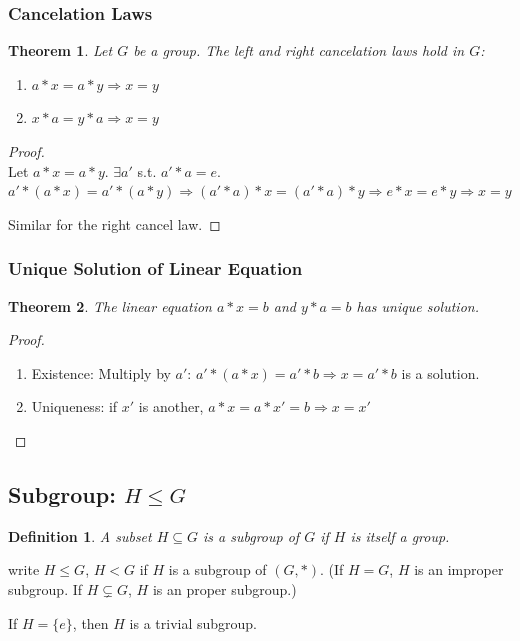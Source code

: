 \documentclass[11pt,a4paper]{article}
\newtheorem{theorem}{Theorem}
\newtheorem{definition}{Definition}
\begin{document}
\subsubsection{Cancelation Laws}
\begin{theorem}
Let $G$ be a group. The left and right cancelation laws hold in $G$:
\begin{enumerate}
    \item $a*x=a*y \Rightarrow x=y$
    \item $x*a=y*a \Rightarrow x=y$
\end{enumerate}
\end{theorem}
\begin{proof}
\quad\\
Let $a*x=a*y$. $\exists a'$ s.t. $a'*a=e$. $a'*(a*x)=a'*(a*y) \Rightarrow (a'*a)*x=(a'*a)*y \Rightarrow	e*x=e*y \Rightarrow	x=y$

Similar for the right cancel law.
\end{proof}

\subsubsection{Unique Solution of Linear Equation}
\begin{theorem}
The linear equation $a*x=b$ and $y*a=b$ has unique solution.
\end{theorem}
\begin{proof}
\quad\\
\begin{enumerate}
    \item Existence: Multiply by $a'$: $a'*(a*x)=a'*b \Rightarrow x=a'*b$ is a solution.
    \item Uniqueness: if $x'$ is another, $a*x=a*x'=b \Rightarrow x=x'$
\end{enumerate}
\end{proof}



\subsection{Subgroup: $H\leq G$}
\begin{definition}
A subset $H\subseteq G$ is a subgroup of $G$ if $H$ is itself a group.
\end{definition}
write $H\leq G$, $H<G$ if $H$ is a subgroup of $(G, *)$. (If $H=G$, $H$ is an improper subgroup. If $H\subsetneq G$, $H$ is an proper subgroup.)

If $H=\{e\}$, then $H$ is a trivial subgroup.
\end{document}
